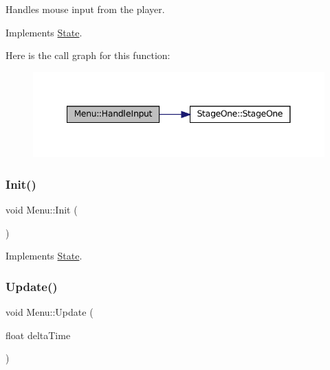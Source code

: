 Handles mouse input from the player. 



Implements \mbox{\hyperlink{classState_ad3de659bdeb45c97486464461d625e8f}{State}}.

Here is the call graph for this function\+:\nopagebreak
\begin{figure}[H]
\begin{center}
\leavevmode
\includegraphics[width=341pt]{classMenu_a0cb3596524ed7fd021f999860b563bf8_cgraph}
\end{center}
\end{figure}
\mbox{\label{classMenu_a2d4c37774fe4c5efe08ee436b0bb1c76}} 
\subsubsection{\texorpdfstring{Init()}{Init()}}
{\footnotesize\ttfamily void Menu\+::\+Init (\begin{DoxyParamCaption}{ }\end{DoxyParamCaption})\hspace{0.3cm}{\ttfamily [virtual]}}



Implements \mbox{\hyperlink{classState_a7ab4d8c6aa239a17ed579d89a209b156}{State}}.

\mbox{\label{classMenu_a4d5311d60fb41b4d0498a6fc820088be}} 
\subsubsection{\texorpdfstring{Update()}{Update()}}
{\footnotesize\ttfamily void Menu\+::\+Update (\begin{DoxyParamCaption}\item[{float}]{delta\+Time }\end{DoxyParamCaption})\hspace{0.3cm}{\ttfamily [virtual]}}



